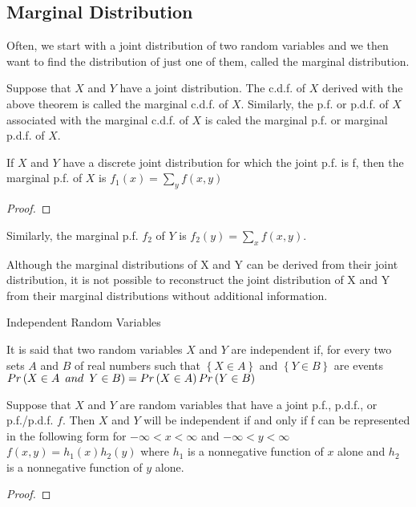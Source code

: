 
\subsection{Marginal Distribution}

{\color{red} Often, we start with a joint distribution of two random variables and we then want to find the distribution of just one of them, called the marginal distribution.}

\begin{definition}
Suppose that $X$ and $Y$ have a joint distribution. The c.d.f. of $X$ derived with the above theorem is called the marginal c.d.f. of $X$. Similarly, the p.f. or p.d.f. of $X$ associated with the marginal c.d.f. of $X$ is caled the marginal p.f. or marginal p.d.f. of $X$.
\end{definition}

\begin{proposition}
If $X$ and $Y$ have a discrete joint distribution for which the joint p.f. is f, then the marginal p.f. of $X$ is $f_{1}\left(x\right)=\sum_{y}f\left(x,y\right)$
\end{proposition}
\begin{proof}
\end{proof}

{\color{red} Similarly, the marginal p.f. $f_{2}$ of $Y$ is $f_{2} \left(y\right)=\sum_{x}f\left(x,y\right)$.}

{\color{red} Although the marginal distributions of X and Y can be derived from their joint distribution, it is not possible to reconstruct the joint distribution of X and Y from their marginal distributions without additional information.}

{\color{red} Independent Random Variables}

\begin{definition}
It is said that two random variables $X$ and $Y$ are independent if, for every two sets $A$ and $B$ of real numbers such that $\left\{ X\in A\right\}$ and $\left\{ Y\in B\right\}$ are events $Pr\left(X\in A\enskip and\enskip Y\in B\right)=Pr\left(X\in A\right)Pr\left(Y\in B\right)$
\end{definition}

\begin{proposition}
Suppose that $X$ and $Y$ are random variables that have a joint p.f., p.d.f., or p.f./p.d.f. $f$. Then $X$ and $Y$ will be independent if and only if f can be represented in the following form for $-\infty<x<\infty$ and $-\infty<y<\infty$ $f\left(x,y\right)=h_{1}\left(x\right)h_{2}\left(y\right)$ where $h_{1}$ is a nonnegative function of $x$ alone and $h_{2}$ is a nonnegative function of $y$ alone.
\end{proposition}
\begin{proof}
\end{proof}

